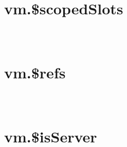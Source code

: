 \begin{lstlisting}[language=JavaScript]

\end{lstlisting}


\section{vm.\$scopedSlots}








\begin{lstlisting}[language=JavaScript]

\end{lstlisting}




\begin{lstlisting}[language=JavaScript]

\end{lstlisting}




\begin{lstlisting}[language=JavaScript]

\end{lstlisting}



\section{vm.\$refs}








\begin{lstlisting}[language=JavaScript]

\end{lstlisting}




\begin{lstlisting}[language=JavaScript]

\end{lstlisting}




\begin{lstlisting}[language=JavaScript]

\end{lstlisting}




\section{vm.\$isServer}









